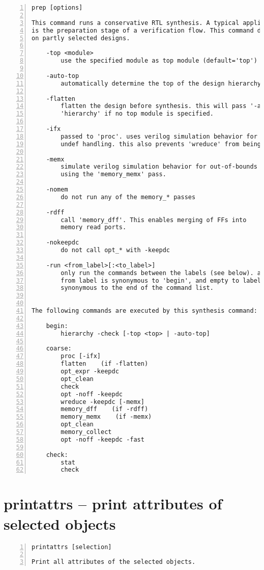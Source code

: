 \begin{lstlisting}[numbers=left,frame=single]
    prep [options]

This command runs a conservative RTL synthesis. A typical application for this
is the preparation stage of a verification flow. This command does not operate
on partly selected designs.

    -top <module>
        use the specified module as top module (default='top')

    -auto-top
        automatically determine the top of the design hierarchy

    -flatten
        flatten the design before synthesis. this will pass '-auto-top' to
        'hierarchy' if no top module is specified.

    -ifx
        passed to 'proc'. uses verilog simulation behavior for verilog if/case
        undef handling. this also prevents 'wreduce' from being run.

    -memx
        simulate verilog simulation behavior for out-of-bounds memory accesses
        using the 'memory_memx' pass.

    -nomem
        do not run any of the memory_* passes

    -rdff
        call 'memory_dff'. This enables merging of FFs into
        memory read ports.

    -nokeepdc
        do not call opt_* with -keepdc

    -run <from_label>[:<to_label>]
        only run the commands between the labels (see below). an empty
        from label is synonymous to 'begin', and empty to label is
        synonymous to the end of the command list.


The following commands are executed by this synthesis command:

    begin:
        hierarchy -check [-top <top> | -auto-top]

    coarse:
        proc [-ifx]
        flatten    (if -flatten)
        opt_expr -keepdc
        opt_clean
        check
        opt -noff -keepdc
        wreduce -keepdc [-memx]
        memory_dff    (if -rdff)
        memory_memx    (if -memx)
        opt_clean
        memory_collect
        opt -noff -keepdc -fast

    check:
        stat
        check
\end{lstlisting}

\section{printattrs -- print attributes of selected objects}
\label{cmd:printattrs}
\begin{lstlisting}[numbers=left,frame=single]
    printattrs [selection]

Print all attributes of the selected objects.
\end{lstlisting}


